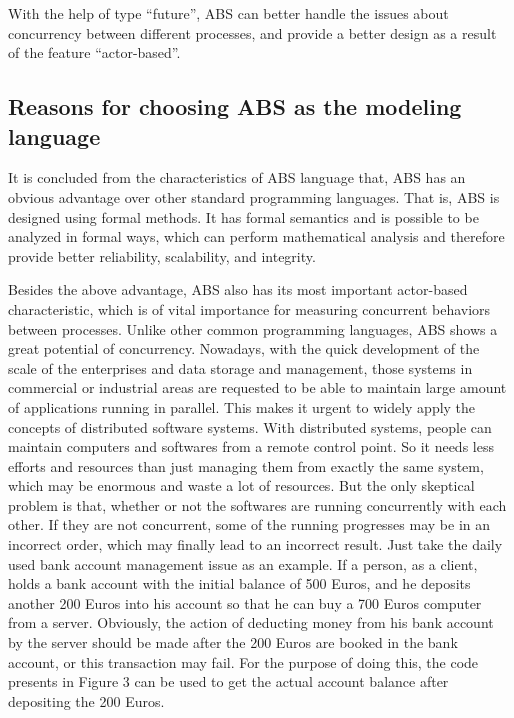 \documentclass[article,dr=phil,type=msc,colorback,accentcolor=tud9c]{tudthesis}
\begin{document}
  With the help of type ``future'', ABS can better handle the issues about concurrency between different processes, and provide a better design as a result of the feature ``actor-based''.
    
  \subsection{Reasons for choosing ABS as the modeling language}
  
  It is concluded from the characteristics of ABS language that, ABS has an obvious advantage over other standard programming languages. That is, ABS is designed using formal methods. It has formal semantics and is possible to be analyzed in formal ways, which can perform mathematical analysis and therefore provide better reliability, scalability, and integrity.\cite{manualabs}
  
  Besides the above advantage, ABS also has its most important actor-based characteristic, which is of vital importance for measuring concurrent behaviors between processes. Unlike other common programming languages, ABS shows a great potential of concurrency. Nowadays, with the quick development of the scale of the enterprises and data storage and management, those systems in commercial or industrial areas are requested to be able to maintain large amount of applications running in parallel. This makes it urgent to widely apply the concepts of distributed software systems. With distributed systems, people can maintain computers and softwares from a remote control point. So it needs less efforts and resources than just managing them from exactly the same system, which may be enormous and waste a lot of resources. But the only skeptical problem is that, whether or not the softwares are running concurrently with each other. If they are not concurrent, some of the running progresses may be in an incorrect order, which may finally lead to an incorrect result. Just take the daily used bank account management issue as an example. If a person, as a client, holds a bank account with the initial balance of 500 Euros, and he deposits another 200 Euros into his account so that he can buy a 700 Euros computer from a server. Obviously, the action of deducting money from his bank account by the server should be made after the 200 Euros are booked in the bank account, or this transaction may fail. For the purpose of doing this, the code presents in Figure 3 can be used to get the actual account balance after depositing the 200 Euros.
  
\end{document}
